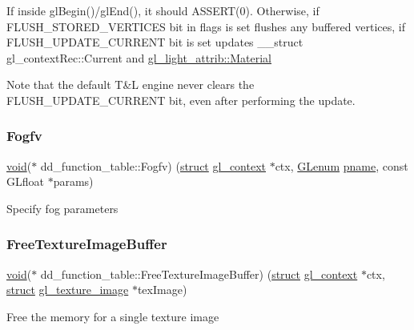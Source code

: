 If inside gl\+Begin()/gl\+End(), it should A\+S\+S\+E\+R\+T(0). Otherwise, if F\+L\+U\+S\+H\+\_\+\+S\+T\+O\+R\+E\+D\+\_\+\+V\+E\+R\+T\+I\+C\+ES bit in {\ttfamily flags} is set flushes any buffered vertices, if F\+L\+U\+S\+H\+\_\+\+U\+P\+D\+A\+T\+E\+\_\+\+C\+U\+R\+R\+E\+NT bit is set updates \+\_\+\+\_\+struct gl\+\_\+context\+Rec\+::\+Current and \hyperlink{structgl__light__attrib_a61b333773d9847f6ae5ce17e11052e9d}{gl\+\_\+light\+\_\+attrib\+::\+Material}

Note that the default T\&L engine never clears the F\+L\+U\+S\+H\+\_\+\+U\+P\+D\+A\+T\+E\+\_\+\+C\+U\+R\+R\+E\+NT bit, even after performing the update. \mbox{\label{structdd__function__table_a31cee9b3e736221e5f7dd13c09ecf155}} 
\subsubsection{\texorpdfstring{Fogfv}{Fogfv}}
{\footnotesize\ttfamily \hyperlink{interfacevoid}{void}($\ast$ dd\+\_\+function\+\_\+table\+::\+Fogfv) (\hyperlink{interfacestruct}{struct} \hyperlink{structgl__context}{gl\+\_\+context} $\ast$ctx, \hyperlink{interfacevoid}{G\+Lenum} \hyperlink{interfacevoid}{pname}, const G\+Lfloat $\ast$params)}

Specify fog parameters \mbox{\label{structdd__function__table_af2144a2c96c3385cb1b48d73c0e4cb02}} 
\subsubsection{\texorpdfstring{Free\+Texture\+Image\+Buffer}{FreeTextureImageBuffer}}
{\footnotesize\ttfamily \hyperlink{interfacevoid}{void}($\ast$ dd\+\_\+function\+\_\+table\+::\+Free\+Texture\+Image\+Buffer) (\hyperlink{interfacestruct}{struct} \hyperlink{structgl__context}{gl\+\_\+context} $\ast$ctx, \hyperlink{interfacestruct}{struct} \hyperlink{structgl__texture__image}{gl\+\_\+texture\+\_\+image} $\ast$tex\+Image)}

Free the memory for a single texture image \mbox{\label{structdd__function__table_a456ec268b948ec165002ec80537e4172}} 
